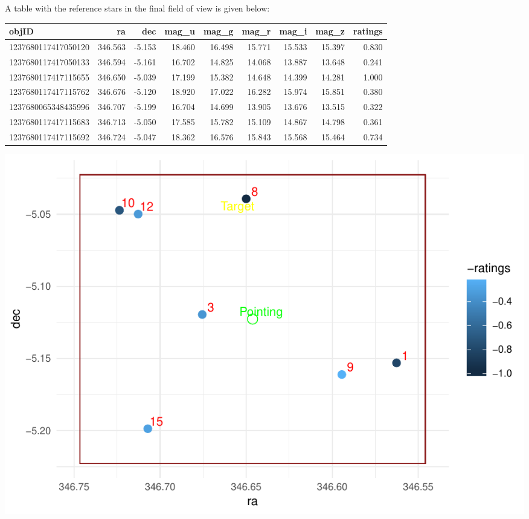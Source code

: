 \documentclass[]{elsarticle} %
\makeatletter
\def\maxwidth{\ifdim\Gin@nat@width>\linewidth\linewidth
\else\Gin@nat@width\fi}
\let\Oldincludegraphics\includegraphics
\renewcommand{\includegraphics}[1]{\Oldincludegraphics[width=\maxwidth]{#1}}
\makeatother
\begin{document}
A table with the reference stars in the final field of view is given
below:

\begin{longtable}[]{@{}lrrrrrrrr@{}}
\toprule
objID & ra & dec & mag\_u & mag\_g & mag\_r & mag\_i & mag\_z &
ratings\tabularnewline
\midrule
\endhead
1237680117417050120 & 346.563 & -5.153 & 18.460 & 16.498 & 15.771 &
15.533 & 15.397 & 0.830\tabularnewline
1237680117417050133 & 346.594 & -5.161 & 16.702 & 14.825 & 14.068 &
13.887 & 13.648 & 0.241\tabularnewline
1237680117417115655 & 346.650 & -5.039 & 17.199 & 15.382 & 14.648 &
14.399 & 14.281 & 1.000\tabularnewline
1237680117417115762 & 346.676 & -5.120 & 18.920 & 17.022 & 16.282 &
15.974 & 15.851 & 0.380\tabularnewline
1237680065348435996 & 346.707 & -5.199 & 16.704 & 14.699 & 13.905 &
13.676 & 13.515 & 0.322\tabularnewline
1237680117417115683 & 346.713 & -5.050 & 17.585 & 15.782 & 15.109 &
14.867 & 14.798 & 0.361\tabularnewline
1237680117417115692 & 346.724 & -5.047 & 18.362 & 16.576 & 15.843 &
15.568 & 15.464 & 0.734\tabularnewline
\bottomrule
\end{longtable}

\includegraphics{Locus_Whole_files/figure-latex/locus_plot-1.pdf}




\end{document}
